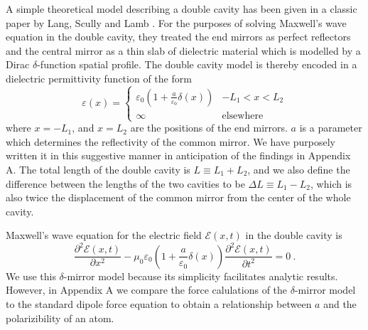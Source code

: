 A simple theoretical model describing a double cavity has been given in a classic paper by 
Lang, Scully and Lamb \cite{lang73}. For the purposes of solving Maxwell's wave equation in the double cavity, they treated the end mirrors as perfect reflectors and the central mirror as a thin slab of dielectric material which is modelled by a Dirac $\delta$-function spatial profile. The double cavity model is thereby encoded in a dielectric permittivity function of the form
 \begin{equation}
\varepsilon(x)=\begin{cases}
\varepsilon_{0}(1+\frac{a}{\varepsilon_{0}} \delta(x)) & -L_{1}<x<L_{2}\\
\infty & \mbox{elsewhere}\end{cases}
\label{perm}
\end{equation}
where $x=-L_{1}$, and $x=L_{2}$ are the positions of the end mirrors. $a$ is a parameter which determines the reflectivity of the common mirror.  We have purposely written it in this suggestive manner in anticipation of the findings in Appendix A. The total length of the double cavity is $L \equiv L_{1}+L_{2}$, and we also define the difference between the lengths of the two cavities to be $\Delta L \equiv L_{1}-L_{2}$,  which is also twice the displacement of the common mirror from the center of the whole cavity. 




Maxwell's wave equation for the electric field $\mathcal{E}(x,t)$ in the double cavity is
\begin{equation}
\frac{\partial^{2}\mathcal{E}(x,t)}{\partial x^{2}}-\mu_{0}\varepsilon_{0}(1+\frac{a}{\varepsilon_{0}}\delta(x))\frac{\partial^{2}\mathcal{E}(x,t)}{\partial t^{2}}=0 \ .
\label{maxwell}
\end{equation}
We use this $\delta$-mirror model because its simplicity facilitates analytic results. However, in Appendix A we compare the force calulations of the $\delta$-mirror model to the standard dipole force equation to obtain a relationship between $a$ and the polarizibility of an atom.   


